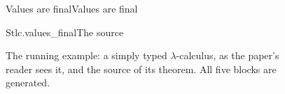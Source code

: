 \documentclass[acmsmall,screen,review,anonymous,nonacm]{acmart}
\begin{document}
\begin{figure}[t]
\begin{leantheorem}[sum=8jx5_cPcFh]{Values are final}{Values are final}
\label{thm:Values-are-final}
\end{leantheorem}

\begin{leansource}[sum=zIy9s_XPen]{Stlc.values_final}{The source}
\end{leansource}
\caption{The running example: a simply typed $\lambda$-calculus, as the
paper's reader sees it, and the source of its theorem. All five blocks are
generated.}
\label{fig:example}
\end{figure}
\end{document}
